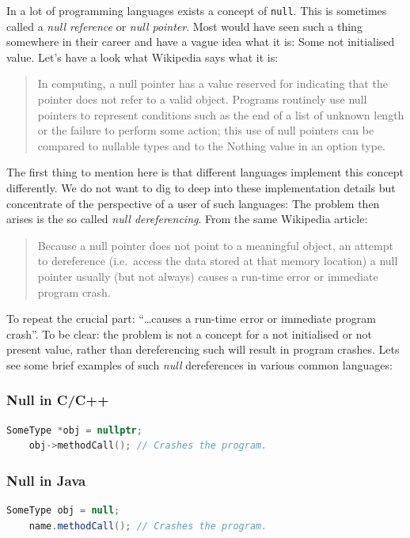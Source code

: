 \documentclass[11pt, a4paper]{report}
\begin{document}
In a lot of programming languages exists a concept of \texttt{null}. This is sometimes called a \textit{null reference} or \textit{null pointer}. Most would have seen such a thing somewhere in their career and have a vague idea what it is: Some not initialised value. Let's have a look what Wikipedia\cite{null-wiki} says what it is:

\begin{quotation}
    In computing, a null pointer has a value reserved for indicating that the pointer does not refer to a valid object. Programs routinely use null pointers to represent conditions such as the end of a list of unknown length or the failure to perform some action; this use of null pointers can be compared to nullable types and to the Nothing value in an option type.
\end{quotation}

The first thing to mention here is that different languages implement this concept differently. We do not want to dig to deep into these implementation details but concentrate of the perspective of a user of such languages: The problem then arises is the so called \textit{null dereferencing}. From the same Wikipedia\cite{null-wiki} article:

\begin{quotation}
    Because a null pointer does not point to a meaningful object, an attempt to dereference (i.e.\ access the data stored at that memory location) a null pointer usually (but not always) causes a run-time error or immediate program crash.
\end{quotation}

\noindent To repeat the crucial part: ``\ldots causes a run-time error or immediate program crash''. To be clear: the problem is not a concept for a not initialised or not present value, rather than dereferencing such will result in program crashes. Lets see some brief examples of such \textit{null} dereferences in various common languages:

\subsubsection{Null in C/C++}
\begin{lstlisting}[language=C++]
    SomeType *obj = nullptr;
    obj->methodCall(); // Crashes the program.
\end{lstlisting}

\subsubsection{Null in Java}
\begin{lstlisting}[language=Java]
    SomeType obj = null;
    name.methodCall(); // Crashes the program.
\end{lstlisting}
\end{document}
